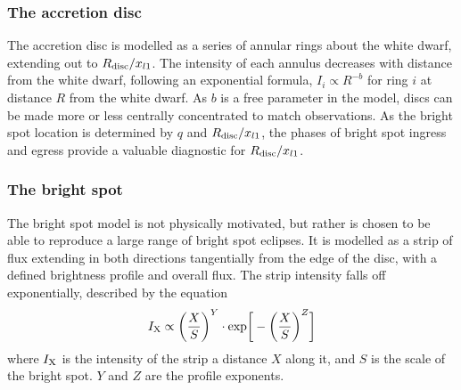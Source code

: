 \subsubsection{The accretion disc}
The accretion disc is modelled as a series of annular rings about the white dwarf, extending out to $R_{\rm disc} / x_{l1}$. The intensity of each annulus decreases with distance from the white dwarf, following an exponential formula, $I_i \propto R^{-b}$ for ring $i$ at distance $R$ from the white dwarf. As $b$ is a free parameter in the model, discs can be made more or less centrally concentrated to match observations. As the bright spot location is determined by $q$ and $R_{\rm disc} / x_{l1}$, the phases of bright spot ingress and egress provide a valuable diagnostic for $R_{\rm disc} / x_{l1}$.

\subsubsection{The bright spot}
The bright spot model is not physically motivated, but rather is chosen to be able to reproduce a large range of bright spot eclipses.
It is modelled as a strip of flux extending in both directions tangentially from the edge of the disc, with a defined brightness profile and overall flux. The strip intensity falls off exponentially, described by the equation
\begin{equation}
    I_{\rm X} \propto \bigg ( \frac{X}{S} \bigg )^Y \cdot {\rm exp} \bigg [ - \bigg (\frac{X}{S} \bigg )^Z \bigg]
\end{equation}
where $I_{\rm X}$ is the intensity of the strip a distance $X$ along it, and $S$ is the scale of the bright spot. $Y$ and $Z$ are the profile exponents.

